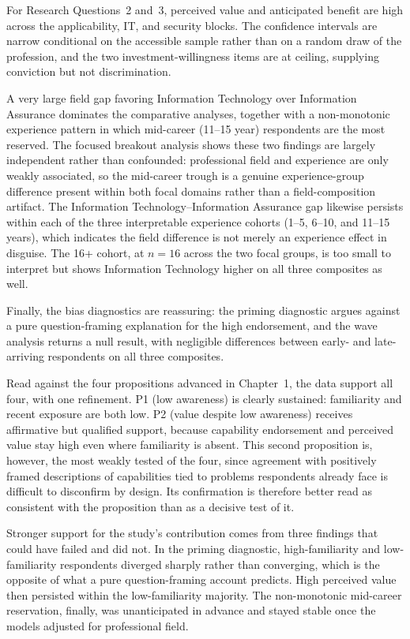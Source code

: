 For Research Questions~2 and~3, perceived value and anticipated benefit are high across the applicability, IT, and security blocks. The confidence intervals are narrow conditional on the accessible sample rather than on a random draw of the profession, and the two investment-willingness items are at ceiling, supplying conviction but not discrimination.

A very large field gap favoring Information Technology over Information Assurance dominates the comparative analyses, together with a non-monotonic experience pattern in which mid-career (11--15 year) respondents are the most reserved. The focused breakout analysis shows these two findings are largely independent rather than confounded: professional field and experience are only weakly associated, so the mid-career trough is a genuine experience-group difference present within both focal domains rather than a field-composition artifact. The Information Technology--Information Assurance gap likewise persists within each of the three interpretable experience cohorts (1--5, 6--10, and 11--15 years), which indicates the field difference is not merely an experience effect in disguise. The 16+ cohort, at $n=16$ across the two focal groups, is too small to interpret but shows Information Technology higher on all three composites as well.

Finally, the bias diagnostics are reassuring: the priming diagnostic argues against a pure question-framing explanation for the high endorsement, and the wave analysis returns a null result, with negligible differences between early- and late-arriving respondents on all three composites.

Read against the four propositions advanced in Chapter~1, the data support all four, with one refinement. P1 (low awareness) is clearly sustained: familiarity and recent exposure are both low. P2 (value despite low awareness) receives affirmative but qualified support, because capability endorsement and perceived value stay high even where familiarity is absent. This second proposition is, however, the most weakly tested of the four, since agreement with positively framed descriptions of capabilities tied to problems respondents already face is difficult to disconfirm by design. Its confirmation is therefore better read as consistent with the proposition than as a decisive test of it.

Stronger support for the study's contribution comes from three findings that could have failed and did not. In the priming diagnostic, high-familiarity and low-familiarity respondents diverged sharply rather than converging, which is the opposite of what a pure question-framing account predicts. High perceived value then persisted within the low-familiarity majority. The non-monotonic mid-career reservation, finally, was unanticipated in advance and stayed stable once the models adjusted for professional field.

